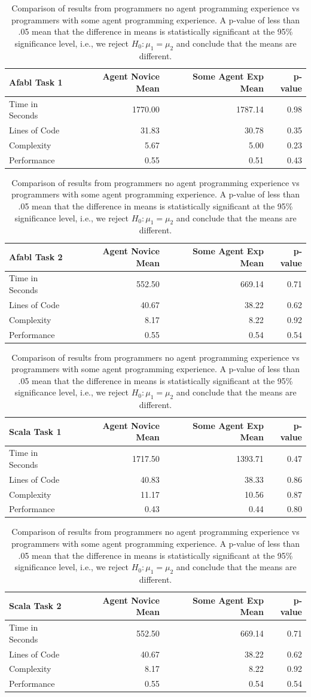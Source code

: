 \begin{center}
\begin{table}[h]
\begin{center}
\begin{tabular}{|l|r|r|r|}\hline
Afabl Task 1 & Agent Novice Mean & Some Agent Exp Mean & p-value \\\hline
Time in Seconds & 1770.00 & 1787.14 & 0.98\\
Lines of Code & 31.83 & 30.78 & 0.35\\
Complexity & 5.67 & 5.00 & 0.23\\
Performance & 0.55 & 0.51 & 0.43\\
\hline
\end{tabular}


\begin{tabular}{|l|r|r|r|}\hline
Afabl Task 2 & Agent Novice Mean & Some Agent Exp Mean & p-value \\\hline
Time in Seconds & 552.50 & 669.14 & 0.71\\
Lines of Code & 40.67 & 38.22 & 0.62\\
Complexity & 8.17 & 8.22 & 0.92\\
Performance & 0.55 & 0.54 & 0.54\\
\hline
\end{tabular}


\begin{tabular}{|l|r|r|r|}\hline
Scala Task 1 & Agent Novice Mean & Some Agent Exp Mean & p-value \\\hline
Time in Seconds & 1717.50 & 1393.71 & 0.47\\
Lines of Code & 40.83 & 38.33 & 0.86\\
Complexity & 11.17 & 10.56 & 0.87\\
Performance & 0.43 & 0.44 & 0.80\\
\hline
\end{tabular}


\begin{tabular}{|l|r|r|r|}\hline
Scala Task 2 & Agent Novice Mean & Some Agent Exp Mean & p-value \\\hline
Time in Seconds & 552.50 & 669.14 & 0.71\\
Lines of Code & 40.67 & 38.22 & 0.62\\
Complexity & 8.17 & 8.22 & 0.92\\
Performance & 0.55 & 0.54 & 0.54\\
\hline
\end{tabular}

\end{center}
\caption{Comparison of results from programmers no agent programming experience vs programmers with some agent programming experience. A p-value of less than .05 mean that the difference in means is statistically significant at the 95\% significance level, i.e., we reject $H_0: \mu_1 = \mu_2$ and conclude that the means are different.}
\label{tbl:agent-experience}
\end{table}
\end{center}





